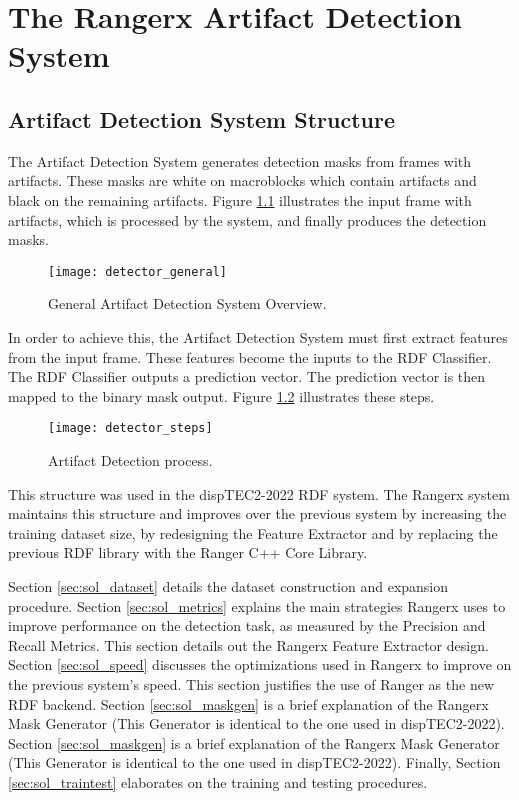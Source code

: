 \chapter{The Rangerx Artifact Detection System}
\label{ch:solucion}

\section{Artifact Detection System Structure}
\label{sec:sol_struct}

The Artifact Detection System generates detection masks from frames with artifacts. These masks are white on macroblocks which contain artifacts and black on the remaining artifacts. Figure \ref{fig:detector_overview} illustrates the input frame with artifacts, which is processed by the system, and finally produces the detection masks.

\begin{figure} [!h]
  \centering
  
  \texttt{[image: detector\_general]}
  
  \caption{General Artifact Detection System Overview. }
  \label{fig:detector_overview}

\end{figure}

In order to achieve this, the Artifact Detection System must first extract features from the input frame. These features become the inputs to the RDF Classifier. The RDF Classifier outputs a prediction vector. The prediction vector is then mapped to the binary mask output. Figure \ref{fig:detector_steps} illustrates these steps.

\begin{figure} [!h]
  \centering
  
  \texttt{[image: detector\_steps]}
  
  \caption{Artifact Detection process. }
  \label{fig:detector_steps}

\end{figure}

This structure was used in the dispTEC2-2022 RDF system. The Rangerx system maintains this structure and improves over the previous system by increasing the training dataset size, by redesigning the Feature Extractor and by replacing the previous RDF library with the Ranger C++ Core Library.

Section \ref{sec:sol_dataset} details the dataset construction and expansion procedure. Section \ref{sec:sol_metrics} explains the main strategies Rangerx uses to improve performance on the detection task, as measured by the Precision and Recall Metrics. This section details out the Rangerx Feature Extractor design. Section \ref{sec:sol_speed} discusses the optimizations used in Rangerx to improve on the previous system's speed. This section justifies the use of Ranger as the new RDF backend. Section \ref{sec:sol_maskgen} is a brief explanation of the Rangerx Mask Generator (This Generator is identical to the one used in dispTEC2-2022). Section \ref{sec:sol_maskgen} is a brief explanation of the Rangerx Mask Generator (This Generator is identical to the one used in dispTEC2-2022). Finally, Section \ref{sec:sol_traintest} elaborates on the training and testing procedures.

